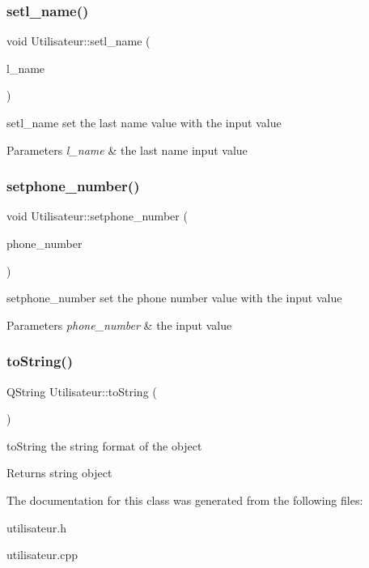 \subsubsection{\texorpdfstring{setl\_name()}{setl\_name()}}
{\footnotesize\ttfamily void Utilisateur\+::setl\+\_\+name (\begin{DoxyParamCaption}\item[{Q\+String}]{l\+\_\+name }\end{DoxyParamCaption})}



setl\+\_\+name set the last name value with the input value 


\begin{DoxyParams}{Parameters}
{\em l\+\_\+name} & the last name input value \\
\hline
\end{DoxyParams}
\mbox{\label{class_utilisateur_aec930972cb1ee96c8352a80d1cff78e7}} 
\subsubsection{\texorpdfstring{setphone\_number()}{setphone\_number()}}
{\footnotesize\ttfamily void Utilisateur\+::setphone\+\_\+number (\begin{DoxyParamCaption}\item[{Q\+String}]{phone\+\_\+number }\end{DoxyParamCaption})}



setphone\+\_\+number set the phone number value with the input value 


\begin{DoxyParams}{Parameters}
{\em phone\+\_\+number} & the input value \\
\hline
\end{DoxyParams}
\mbox{\label{class_utilisateur_a99523ad9c5e75e677240da2f3c6b63aa}} 
\subsubsection{\texorpdfstring{toString()}{toString()}}
{\footnotesize\ttfamily Q\+String Utilisateur\+::to\+String (\begin{DoxyParamCaption}{ }\end{DoxyParamCaption})}



to\+String the string format of the object 

\begin{DoxyReturn}{Returns}
string object 
\end{DoxyReturn}


The documentation for this class was generated from the following files\+:\begin{DoxyCompactItemize}
\item 
utilisateur.\+h\item 
utilisateur.\+cpp\end{DoxyCompactItemize}
